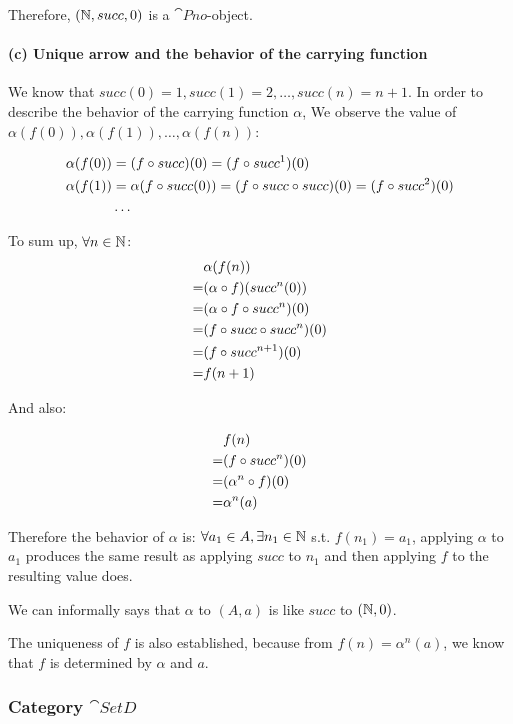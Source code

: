 \documentclass[11pt]{article}
\begin{document}
Therefore, $(\mathbb{N}, succ, 0)$ is a $\cat{Pno}$-object.

\paragraph{(c) Unique arrow and the behavior of the carrying function}\mbox{}

We know that $succ(0) = 1, succ(1) = 2, \ldots, succ(n) = n + 1$.
In order to describe the behavior of the carrying function $\alpha$,
We observe the value of $\alpha(f(0)), \alpha(f(1)), \ldots, \alpha(f(n))$:

\begin{align*}
\alpha(f(0)) & = (f \circ succ)(0) = (f \circ succ^1)(0) \\
\alpha(f(1)) & = \alpha(f \circ succ (0)) = (f \circ succ \circ succ)(0)
= (f \circ succ^2)(0) \\
& \ldots
\end{align*}

To sum up, $\forall n \in \mathbb{N}$:
\begin{align*}
& \alpha(f(n)) \\
= &(\alpha \circ f)(succ^n(0)) \\
= &(\alpha \circ f \circ succ^n) (0) \\
= &(f \circ succ \circ succ^n) (0) \\
= &(f \circ succ^{n+1})(0) \\
= &f(n+1)
\end{align*}

And also:

\begin{align*}
& f(n) \\
= & (f \circ succ^{n})(0) \\
= & (\alpha^n \circ f)(0) \\
= & \alpha^n(a)
\end{align*}

Therefore the behavior of $\alpha$ is: $\forall a_1 \in A, \exists n_1 \in \mathbb{N}$
s.t. $f(n_1) = a_1$, applying $\alpha$ to $a_1$ produces the same result as
applying $succ$ to $n_1$ and then applying $f$ to the resulting value does.

We can informally says that $\alpha$ to $(A,a)$ is like $succ$ to $(\mathbb{N},0)$.

The uniqueness of $f$ is also established, because from $f(n) = \alpha^n(a)$,
we know that $f$ is determined by $\alpha$ and $a$.

\subsubsection{Category $\cat{SetD}$}
\end{document}
